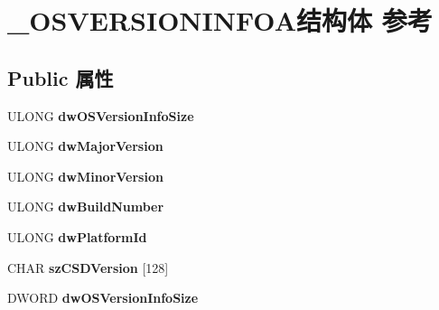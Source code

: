 \hypertarget{struct___o_s_v_e_r_s_i_o_n_i_n_f_o_a}{}\section{\+\_\+\+O\+S\+V\+E\+R\+S\+I\+O\+N\+I\+N\+F\+O\+A结构体 参考}
\label{struct___o_s_v_e_r_s_i_o_n_i_n_f_o_a}
\subsection*{Public 属性}
\begin{DoxyCompactItemize}
\item 
\mbox{\label{struct___o_s_v_e_r_s_i_o_n_i_n_f_o_a_a800b0c8abdd10109f2d1cd0ee3810f79}} 
U\+L\+O\+NG {\bfseries dw\+O\+S\+Version\+Info\+Size}
\item 
\mbox{\label{struct___o_s_v_e_r_s_i_o_n_i_n_f_o_a_a83cc81837b44cf5e87951851f657cd8b}} 
U\+L\+O\+NG {\bfseries dw\+Major\+Version}
\item 
\mbox{\label{struct___o_s_v_e_r_s_i_o_n_i_n_f_o_a_ad804e23049554b775d4bd8948449afaf}} 
U\+L\+O\+NG {\bfseries dw\+Minor\+Version}
\item 
\mbox{\label{struct___o_s_v_e_r_s_i_o_n_i_n_f_o_a_aa1d0db900f63b06cac0a45daf9bf90d7}} 
U\+L\+O\+NG {\bfseries dw\+Build\+Number}
\item 
\mbox{\label{struct___o_s_v_e_r_s_i_o_n_i_n_f_o_a_a5bc2921429cd35ce9366ff0331965bd0}} 
U\+L\+O\+NG {\bfseries dw\+Platform\+Id}
\item 
\mbox{\label{struct___o_s_v_e_r_s_i_o_n_i_n_f_o_a_a2adce3d6557b1d0023b2c3a4bf1cfccd}} 
C\+H\+AR {\bfseries sz\+C\+S\+D\+Version} \mbox{[}128\mbox{]}
\item 
\mbox{\label{struct___o_s_v_e_r_s_i_o_n_i_n_f_o_a_a24763df8e3a27f05e32933767b302061}} 
D\+W\+O\+RD {\bfseries dw\+O\+S\+Version\+Info\+Size}
\item 
\mbox{\label{struct___o_s_v_e_r_s_i_o_n_i_n_f_o_a_a0d36fbc1a9d846e76013f9fd94e32234}} 

\end{DoxyCompactItemize}

